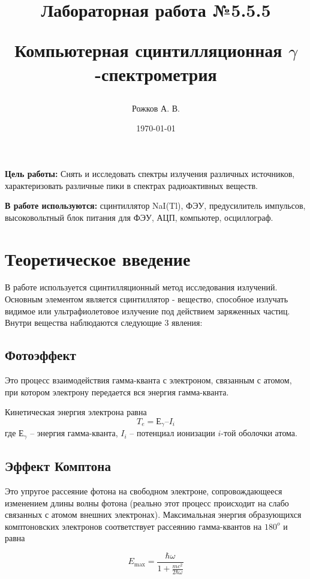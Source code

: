 \documentclass[a4paper, 12pt]{article}
\title{\begin{center}Лабораторная работа №5.5.5\end{center}
Компьютерная сцинтилляционная $\gamma$-спектрометрия}
\author{Рожков А. В.}
\date{\today}
\begin{document}
    \maketitle
    \newpage

    \textbf{Цель работы:} Снять и исследовать спектры излучения различных источников, характеризовать различные пики в спектрах радиоактивных веществ.

    \textbf{В работе используются:} сцинтиллятор NaI(Tl), ФЭУ, предусилитель импульсов, высоковольтный блок питания для ФЭУ, АЦП, компьютер, осциллограф.

    \section{Теоретическое введение}

        В работе используется сцинтилляционный метод исследования излучений. Основным элементом является сцинтиллятор - вещество, способное излучать видимое или ультрафиолетовое излучение под действием заряженных частиц. Внутри вещества наблюдаются следующие 3 явления:

        \subsection{Фотоэффект}

            Это процесс взаимодействия гамма-кванта с электроном, связанным с атомом, при котором электрону передается вся энергия гамма-кванта.

            Кинетическая энергия электрона равна
            $$
                T_e = Е_\gamma – I_i
            $$
            где $Е_\gamma$ – энергия гамма-кванта, $I_i$ – потенциал ионизации $i$-той оболочки атома.

        \subsection{Эффект Комптона}

            Это упругое рассеяние фотона на свободном электроне, сопровождающееся изменением длины волны фотона (реально этот процесс происходит на слабо связанных с атомом внешних электронах). Максимальная энергия образующихся комптоновских электронов соответствует рассеянию гамма-квантов на $180^o$ и равна

            $$
                E_{\max} = \frac{\hbar\omega}{1 + \frac{mc^2}{2\hbar\omega}}
            $$
\end{document}
